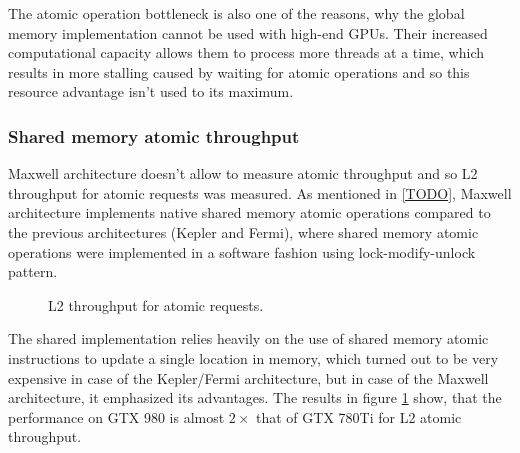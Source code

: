 The atomic operation bottleneck is also one of the reasons, why the global memory implementation cannot be used with high-end GPUs. Their increased computational capacity allows them to process more threads at a time, which results in more stalling caused by waiting for atomic operations and so this resource advantage isn't used to its maximum.

\subsubsection{Shared memory atomic throughput}

Maxwell architecture doesn't allow to measure atomic throughput and so L2 throughput for atomic requests was measured. As mentioned in \ref{TODO}, Maxwell architecture implements native shared memory atomic operations compared to the previous architectures (Kepler and Fermi), where shared memory atomic operations were implemented in a software fashion using lock-modify-unlock pattern.

\begin{figure}[ht]
\centering{}
	\caption{L2 throughput for atomic requests.}
		\label{fig:l2-atomic-shared}
\end{figure}

The shared implementation relies heavily on the use of shared memory atomic instructions to update a single location in memory, which turned out to be very expensive in case of the Kepler/Fermi architecture, but in case of the Maxwell architecture, it emphasized its advantages. The results in figure \ref{fig:l2-atomic-shared} show, that the performance on GTX 980 is almost $2\times$ that of GTX 780Ti for L2 atomic throughput.

